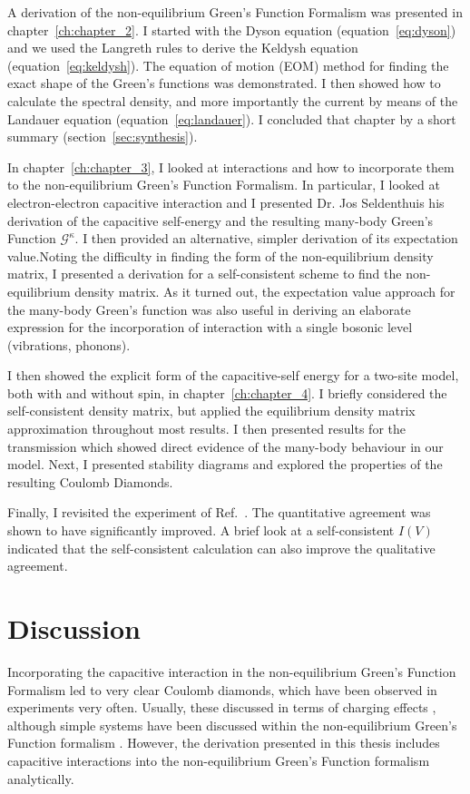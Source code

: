 A derivation of the non-equilibrium Green's Function Formalism was presented in chapter~\ref{ch:chapter_2}. I started with the Dyson equation (equation~\ref{eq:dyson}) and we used the Langreth rules to derive the Keldysh equation (equation~\ref{eq:keldysh}). The equation of motion (EOM) method for finding the exact shape of the Green's functions was demonstrated. I then showed how to calculate the spectral density, and more importantly the current by means of the Landauer equation (equation~\ref{eq:landauer}). I concluded that chapter by a short summary (section~\ref{sec:synthesis}).

In chapter~\ref{ch:chapter_3}, I looked at interactions and how to incorporate them to the non\hyp{}equilibrium Green's Function Formalism. In particular, I looked at electron-electron capacitive interaction and I presented Dr. Jos Seldenthuis his derivation of the capacitive self-energy and the resulting many-body Green's Function $\mathscr{G}^\kappa$. I then provided an alternative, simpler derivation of its expectation value.Noting the difficulty in finding the form of the non-equilibrium density matrix, I presented a derivation for a self-consistent scheme to find the non-equilibrium density matrix. As it turned out, the expectation value approach for the many-body Green's function was also useful in deriving an elaborate expression for the incorporation of interaction with a single bosonic level (vibrations, phonons). 

I then showed the explicit form of the capacitive-self energy for a two-site model, both with and without spin, in chapter~\ref{ch:chapter_4}. I briefly considered the self-consistent density matrix, but applied the equilibrium density matrix approximation throughout most results. I then presented results for the transmission which showed direct evidence of the many-body behaviour in our model. Next, I presented stability diagrams and explored the properties of the resulting Coulomb Diamonds. 

Finally, I revisited the experiment of Ref.~\cite{perrinnano}. The quantitative agreement was shown to have significantly improved. A brief look at a self-consistent $I(V)$ indicated that the self-consistent calculation can also improve the qualitative agreement.

\section{Discussion}
\label{sec:discussion}
Incorporating the capacitive interaction in the non-equilibrium Green's Function Formalism led to very clear Coulomb diamonds, which have been observed in experiments very often. Usually, these discussed in terms of charging effects \cite{seldenthuis, thijszantrev}, although simple systems have been discussed within the non-equilibrium Green's Function formalism \cite{haugjauho}. However, the derivation presented in this thesis includes capacitive interactions into the non-equilibrium Green's Function formalism analytically.


